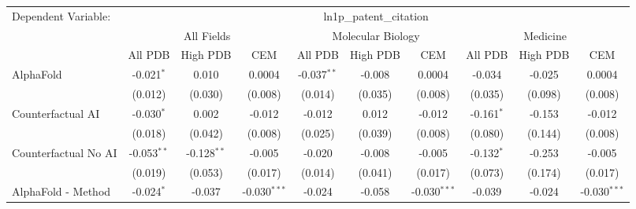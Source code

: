\begingroup
\centering
\begin{tabular}{lccccccccc}
   \tabularnewline \midrule \midrule
   Dependent Variable: & \multicolumn{9}{c}{ln1p\_patent\_citation}\\
 & \multicolumn{3}{c}{All Fields} & \multicolumn{3}{c}{Molecular Biology} & \multicolumn{3}{c}{Medicine} \\
\cmidrule(lr){2-7} \cmidrule(lr){5-10} \cmidrule(lr){8-7}
 & \multicolumn{1}{c}{All PDB} & \multicolumn{1}{c}{High PDB} & \multicolumn{1}{c}{CEM} & \multicolumn{1}{c}{All PDB} & \multicolumn{1}{c}{High PDB} & \multicolumn{1}{c}{CEM} & \multicolumn{1}{c}{All PDB} & \multicolumn{1}{c}{High PDB} & \multicolumn{1}{c}{CEM} \\
\cmidrule(lr){2-3} \cmidrule(lr){3-4} \cmidrule(lr){4-5} \cmidrule(lr){5-6} \cmidrule(lr){6-7} \cmidrule(lr){7-8} \cmidrule(lr){8-9} \cmidrule(lr){9-10} \cmidrule(lr){10-3}
   AlphaFold                                                   & -0.021$^{*}$  & 0.010         & 0.0004         & -0.037$^{**}$ & -0.008       & 0.0004         & -0.034       & -0.025       & 0.0004\\   
                                                               & (0.012)       & (0.030)       & (0.008)        & (0.014)       & (0.035)      & (0.008)        & (0.035)      & (0.098)      & (0.008)\\   
   Counterfactual AI                                           & -0.030$^{*}$  & 0.002         & -0.012         & -0.012        & 0.012        & -0.012         & -0.161$^{*}$ & -0.153       & -0.012\\   
                                                               & (0.018)       & (0.042)       & (0.008)        & (0.025)       & (0.039)      & (0.008)        & (0.080)      & (0.144)      & (0.008)\\   
   Counterfactual No AI                                        & -0.053$^{**}$ & -0.128$^{**}$ & -0.005         & -0.020        & -0.008       & -0.005         & -0.132$^{*}$ & -0.253       & -0.005\\   
                                                               & (0.019)       & (0.053)       & (0.017)        & (0.014)       & (0.041)      & (0.017)        & (0.073)      & (0.174)      & (0.017)\\   
   AlphaFold - Method                                          & -0.024$^{*}$  & -0.037        & -0.030$^{***}$ & -0.024        & -0.058       & -0.030$^{***}$ & -0.039       & -0.024       & -0.030$^{***}$\\   

\end{tabular}
